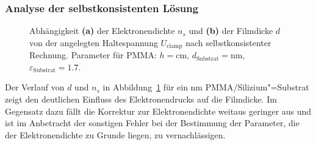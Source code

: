 \subsubsection{Analyse der selbstkonsistenten Lösung}

\begin{figure}[h!tbp]
	\begin{center}
	\end{center}
	\caption[Elektronendichte auf PMMA, selbstkonsistente Rechnung]{Abhängigkeit {\bfseries (a)} der Elektronendichte $n_s$ und {\bfseries (b)} der Filmdicke $d$ von der angelegten Haltespannung $U_\text{clamp}$ nach selbstkonsistenter Rechnung. Parameter für PMMA: $h=$\unit[1]{cm}, $d_\text{Substrat}=$\unit[200]{nm}, $\varepsilon_\text{Substrat}=1.7$.}\label{fig:film_selbstkonsistent2}
\end{figure}

Der Verlauf von $d$ und $n_s$ in Abbildung~\ref{fig:film_selbstkonsistent2} für ein \unit[200]{nm} PMMA/Silizium"=Substrat zeigt den deutlichen Einfluss des Elektronendrucks auf die Filmdicke. Im Gegensatz dazu fällt die Korrektur zur Elektronendichte weitaus geringer aus und ist im Anbetracht der sonstigen Fehler bei der Bestimmung der Parameter, die der Elektronendichte zu Grunde liegen, zu vernachlässigen.

